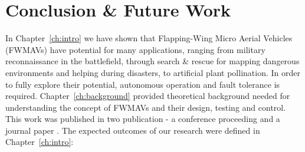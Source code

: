 \chapter{Conclusion \& Future Work}
\label{ch:conclusion}

In Chapter~\ref{ch:intro} we have shown that Flapping-Wing Micro Aerial Vehicles (FWMAVs) have potential for many applications, ranging from military reconnaissance in the battlefield, through search \& rescue for mapping dangerous environments and helping during disasters, to artificial plant pollination. In order to fully explore their potential, autonomous operation and fault tolerance is required. Chapter~\ref{ch:background} provided theoretical background needed for understanding the concept of FWMAVs and their design, testing and control. This work was published in two publication - a conference proceeding \cite{podhrad1} and a journal paper \cite{podhrad2}. The expected outcomes of our research were defined in Chapter~\ref{ch:intro}:


